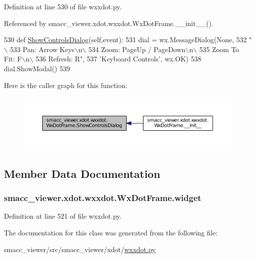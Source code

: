 Definition at line 530 of file wxxdot.\+py.



Referenced by smacc\+\_\+viewer.\+xdot.\+wxxdot.\+Wx\+Dot\+Frame.\+\_\+\+\_\+init\+\_\+\+\_\+().


\begin{DoxyCode}
530   \textcolor{keyword}{def }\hyperlink{classsmacc__viewer_1_1xdot_1_1wxxdot_1_1WxDotFrame_a5116d653e19a10b16c0efed6aae13874}{ShowControlsDialog}(self,event):
531     dial = wx.MessageDialog(\textcolor{keywordtype}{None},
532         \textcolor{stringliteral}{"\(\backslash\)}
533 \textcolor{stringliteral}{Pan: Arrow Keys\(\backslash\)n\(\backslash\)}
534 \textcolor{stringliteral}{Zoom: PageUp / PageDown\(\backslash\)n\(\backslash\)}
535 \textcolor{stringliteral}{Zoom To Fit: F\(\backslash\)n\(\backslash\)}
536 \textcolor{stringliteral}{Refresh: R"},
537         \textcolor{stringliteral}{'Keyboard Controls'}, wx.OK)
538     dial.ShowModal()
539 
\end{DoxyCode}


Here is the caller graph for this function\+:
\nopagebreak
\begin{figure}[H]
\begin{center}
\leavevmode
\includegraphics[width=350pt]{classsmacc__viewer_1_1xdot_1_1wxxdot_1_1WxDotFrame_a5116d653e19a10b16c0efed6aae13874_icgraph}
\end{center}
\end{figure}




\subsection{Member Data Documentation}
\subsubsection[{\texorpdfstring{widget}{widget}}]{\setlength{\rightskip}{0pt plus 5cm}smacc\+\_\+viewer.\+xdot.\+wxxdot.\+Wx\+Dot\+Frame.\+widget}\hypertarget{classsmacc__viewer_1_1xdot_1_1wxxdot_1_1WxDotFrame_ab72815878b25f1f3c85c5bf6cc3eaaf9}{}\label{classsmacc__viewer_1_1xdot_1_1wxxdot_1_1WxDotFrame_ab72815878b25f1f3c85c5bf6cc3eaaf9}


Definition at line 521 of file wxxdot.\+py.



The documentation for this class was generated from the following file\+:\begin{DoxyCompactItemize}
\item 
smacc\+\_\+viewer/src/smacc\+\_\+viewer/xdot/\hyperlink{wxxdot_8py}{wxxdot.\+py}\end{DoxyCompactItemize}

